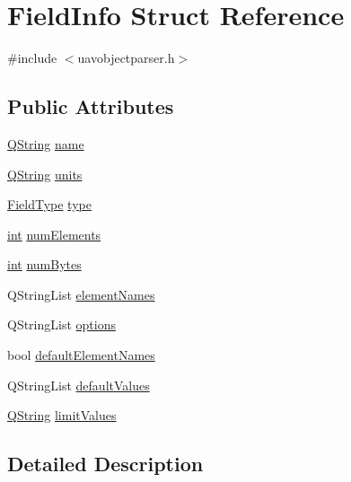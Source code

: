 \hypertarget{struct_field_info}{\section{Field\-Info Struct Reference}
\label{struct_field_info}
}


{\ttfamily \#include $<$uavobjectparser.\-h$>$}

\subsection*{Public Attributes}
\begin{DoxyCompactItemize}
\item 
\hyperlink{group___u_a_v_objects_plugin_gab9d252f49c333c94a72f97ce3105a32d}{Q\-String} \hyperlink{struct_field_info_afca58915a68fecfa045738e2fe98e670}{name}
\item 
\hyperlink{group___u_a_v_objects_plugin_gab9d252f49c333c94a72f97ce3105a32d}{Q\-String} \hyperlink{struct_field_info_affe71f2ec30acaab0ae16d17f0c7d2a4}{units}
\item 
\hyperlink{uavobjectparser_8h_aa01498a3ceb2fa74dc9536c16caef1da}{Field\-Type} \hyperlink{struct_field_info_a4bdab922a850f6d0f19057252fd2e71e}{type}
\item 
\hyperlink{ioapi_8h_a787fa3cf048117ba7123753c1e74fcd6}{int} \hyperlink{struct_field_info_a5102b52d6aea7eff9a1578fee7024039}{num\-Elements}
\item 
\hyperlink{ioapi_8h_a787fa3cf048117ba7123753c1e74fcd6}{int} \hyperlink{struct_field_info_a8f7c0cc23d2078b4c22fcfff86577ba6}{num\-Bytes}
\item 
Q\-String\-List \hyperlink{struct_field_info_abbf4c6f307fbb7644411f4203a8f6a6f}{element\-Names}
\item 
Q\-String\-List \hyperlink{struct_field_info_ae593af22164dd683eb9b98e91dd5029e}{options}
\item 
bool \hyperlink{struct_field_info_a1782f0245c493a8962d7a85e7f84c80d}{default\-Element\-Names}
\item 
Q\-String\-List \hyperlink{struct_field_info_ad2ac81dee4a7a1e956145bc4160ef5f1}{default\-Values}
\item 
\hyperlink{group___u_a_v_objects_plugin_gab9d252f49c333c94a72f97ce3105a32d}{Q\-String} \hyperlink{struct_field_info_af973f5eaeafa286bf804183878014a66}{limit\-Values}
\end{DoxyCompactItemize}


\subsection{Detailed Description}


